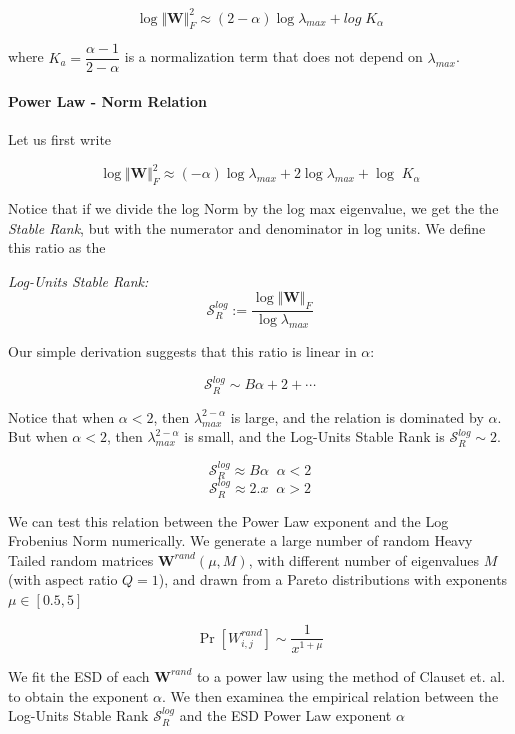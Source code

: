 $$\log\Vert\mathbf{W}\Vert^{2}_{F}\approx(2-\alpha)\log\lambda_{max}+log\;K_{\alpha}$$

where $K_{a}={\dfrac{\alpha-1}{2-\alpha}}$ is a normalization term that does not  depend on $\lambda_{max}$.

\paragraph{Power Law - Norm Relation}


Let us first write

$$\log\Vert\mathbf{W}\Vert^{2}_{F}\approx(-\alpha)\log\lambda_{max}+2\log\lambda_{max}+\log\;K_{\alpha}$$

Notice that if we divide the log Norm by the log max eigenvalue, we get the the \emph{Stable Rank}, but with
the numerator and denominator in log units.  We define this ratio as the

\emph{Log-Units Stable Rank:  } 
$$\mathcal{S}^{log}_{R}:=\dfrac{\log\Vert\mathbf{W}\Vert_{F}}{\log\lambda_{max}}$$

Our simple derivation suggests that this ratio is linear in $\alpha$:

$$\mathcal{S}^{log}_{R}\sim B\alpha+2+\cdots$$


Notice that when $\alpha<2$, then $\lambda_{max}^{2-\alpha}$ is large, and the relation is dominated by $\alpha$.
But when $\alpha<2$, then $\lambda_{max}^{2-\alpha}$ is small, and the Log-Units Stable Rank is $\mathcal{S}^{log}_{R}\sim 2$.

$$\mathcal{S}^{log}_{R}\approx B\alpha\;\;\alpha<2$$
$$\mathcal{S}^{log}_{R}\approx 2.x\;\;\alpha>2$$


We can test this relation between the Power Law exponent and the Log Frobenius Norm numerically.
We generate a large number of random Heavy Tailed random matrices $\mathbf{W}^{rand}(\mu,M)$, 
with different number of eigenvalues $M$ (with aspect ratio $Q=1$), 
and drawn from a Pareto distributions with exponents $\mu\in[0.5, 5]$

$$\Pr[{W}^{rand}_{i,j}]\sim\dfrac{1}{x^{1+\mu}}$$

We fit the ESD of each $\mathbf{W}^{rand}$ to a power law using the method of Clauset et. al.
to obtain the exponent $\alpha$.  We then examinea the empirical relation between  the Log-Units Stable Rank 
$\mathcal{S}^{log}_{R}$ and the ESD Power Law exponent $\alpha$

